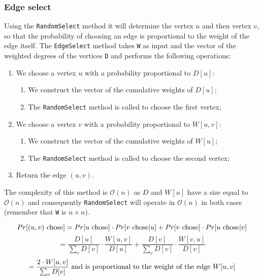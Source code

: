 \subsubsection*{Edge select}
Using the \verb|RandomSelect| method it will determine the vertex $u$ and then vertex $v$, so that the probability of choosing an edge is proportional to the weight of the edge itself. The \verb|EdgeSelect| method takes \verb|W| as input and the vector of the weighted degrees of the vertices \verb|D| and performs the following operations:
\begin{enumerate}
    \item We choose a vertex $u$ with a probability proportional to $D[u]$:
    \begin{enumerate}
        \item We construct the vector of the cumulative weights of $D[u]$;
        \item The \verb|RandomSelect| method is called to choose the first vertex;
    \end{enumerate}
    \item We choose a vertex $v$ with a probability proportional to $W[u,v]$:
    \begin{enumerate}
        \item We construct the vector of the cumulative weights of $W[u]$;
        \item The \verb|RandomSelect| method is called to choose the second vertex;
    \end{enumerate}
    \item Return the edge $(u,v)$.
\end{enumerate}
The complexity of this method is $\mathcal{O}(n)$ as $D$ and $W[u]$ have a size equal to $\mathcal{O}(n)$ and consequently \verb|RandomSelect| will operate in $\mathcal{O}(n)$ in both cases (remember that \verb|W| is $n \times n$).

\[
    Pr[(u,v) \textnormal{ chose}] = Pr[u \textnormal{ chose}] \cdot 
    Pr[v \textnormal{ chose} | u] + Pr[v \textnormal{ chose}] \cdot 
    Pr[u \textnormal{ chose} | v]
\]
\[
    = \frac{D[u]}{\sum_v D[v]} \cdot \frac{W[u,v]}{D[u]} + \frac{D[v]}{\sum_v D[v]} 
    \cdot \frac{W[v,u]}{D[v]}
\]
\[
    = \frac{2 \cdot W[u,v]}{\sum_v D[v]} \textnormal{ and is proportional to the weight of the edge } W[u,v]
\]

